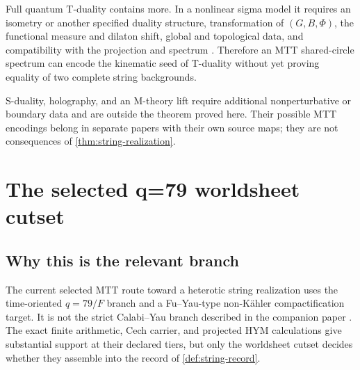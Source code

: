 \documentclass[11pt]{article}
\theoremstyle{definition}
\theoremstyle{remark}
\begin{document}
Full quantum T-duality contains more.  In a nonlinear sigma model it requires
an isometry or another specified duality structure, transformation of
\((G,B,\Phi)\), the functional measure and dilaton shift, global and
topological data, and compatibility with the projection and spectrum
\cite{Buscher1988}.  Therefore an MTT shared-circle spectrum can encode the
kinematic seed of T-duality without yet proving equality of two complete
string backgrounds.

S-duality, holography, and an M-theory lift require additional nonperturbative
or boundary data and are outside the theorem proved here.  Their possible
MTT encodings belong in separate papers with their own source maps; they are
not consequences of \cref{thm:string-realization}.

\section{The selected q=79 worldsheet cutset}
\label{sec:q79}

\subsection{Why this is the relevant branch}

The current selected MTT route toward a heterotic string realization uses
the time-oriented \(q=79/F\) branch and a Fu--Yau-type non-K\"ahler
compactification target.  It is not the strict Calabi--Yau branch described
in the companion paper \cite{NeroCalabiYau2026}.  The exact finite arithmetic,
Cech carrier, and projected HYM calculations give substantial support at
their declared tiers, but only the worldsheet cutset decides whether they
assemble into the record of \cref{def:string-record}.
\end{document}
